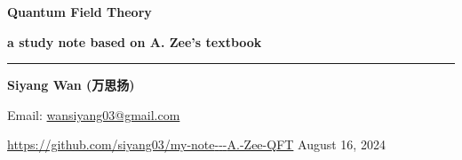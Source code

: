 \begin{titlepage}
	\vspace*{100pt}
	{\Huge \textbf{Quantum Field Theory}}
	
	\vspace{10pt}
	
	{\LARGE \textbf{a study note based on A. Zee's textbook}}
	
	\vspace{30pt}
	
	\noindent\rule[0.5ex]{\linewidth}{2pt} %
	
	\vspace{30pt}
	
	{\large \textbf{Siyang Wan (万思扬)}}
	
	\vfill
	
	Email: \href{mailto:wansiyang03@gmail.com}{wansiyang03@gmail.com}
	
	\href{https://github.com/siyang03/my-note---A.-Zee-QFT}{https://github.com/siyang03/my-note{-}{-}{-}A.-Zee-QFT} \hfill August 16, 2024
\end{titlepage}